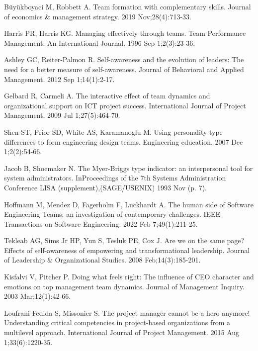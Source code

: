 \documentclass[runningheads]{llncs}
\begin{document}
%
%
%
% 
% 
%
\begin{thebibliography}{8}


Büyükboyaci M, Robbett A. Team formation with complementary skills. Journal of economics \& management strategy. 2019 Nov;28(4):713-33.


Harris PR, Harris KG. Managing effectively through teams. Team Performance Management: An International Journal. 1996 Sep 1;2(3):23-36.

  Ashley GC, Reiter-Palmon R. Self-awareness and the evolution of leaders: The need for a better measure of self-awareness. Journal of Behavioral and Applied Management. 2012 Sep 1;14(1):2-17.

Gelbard R, Carmeli A. The interactive effect of team dynamics and organizational support on ICT project success. International Journal of Project Management. 2009 Jul 1;27(5):464-70.

Shen ST, Prior SD, White AS, Karamanoglu M. Using personality type differences to form engineering design teams. Engineering education. 2007 Dec 1;2(2):54-66.

Jacob B, Shoemaker N. The Myer-Briggs type indicator: an interpersonal tool for system administrators. InProceedings of the 7th Systems Administration Conference LISA (supplement),(SAGE/USENIX) 1993 Nov (p. 7).

Hoffmann M, Mendez D, Fagerholm F, Luckhardt A. The human side of Software Engineering Teams: an investigation of contemporary challenges. IEEE Transactions on Software Engineering. 2022 Feb 7;49(1):211-25.

Tekleab AG, Sims Jr HP, Yun S, Tesluk PE, Cox J. Are we on the same page? Effects of self-awareness of empowering and transformational leadership. Journal of Leadership & Organizational Studies. 2008 Feb;14(3):185-201.

Kisfalvi V, Pitcher P. Doing what feels right: The influence of CEO character and emotions on top management team dynamics. Journal of Management Inquiry. 2003 Mar;12(1):42-66.

Loufrani-Fedida S, Missonier S. The project manager cannot be a hero anymore! Understanding critical competencies in project-based organizations from a multilevel approach. International Journal of Project Management. 2015 Aug 1;33(6):1220-35.

\end{thebibliography}
\end{document}
